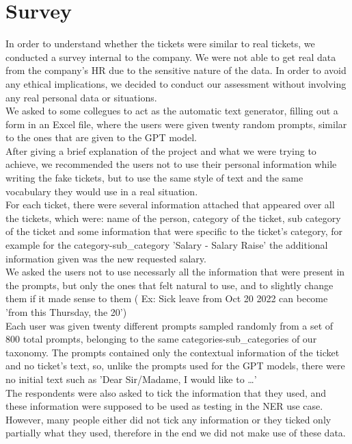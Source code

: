 \section{Survey}
\label{sec:survey}
In order to understand whether the tickets were similar to real tickets, we conducted a survey internal to the company. We were not able to get real data from the company's HR due to the sensitive nature of the data. In order to avoid any ethical implications, we decided to conduct our assessment without involving any real personal data or situations.  \\
We asked to some collegues to act as the automatic text generator, filling out a form in an Excel file, where the users were given twenty random prompts, similar to the ones that are given to the GPT model. \\
After giving a brief explanation of the project and what we were trying to achieve, we recommended the users not to use their personal information while writing the fake tickets, but to use the same style of text and the same vocabulary they would use in a real situation. \\
For each ticket, there were several information attached that appeared over all the tickets, which were: name of the person, category of the ticket, sub category of the ticket and some information that were specific to the ticket's category, for example for the category-sub\_category 'Salary - Salary Raise' the additional information given was the new requested salary. \\
We asked the users not to use necessarly all the information that were present in the prompts, but only the ones that felt natural to use, and to slightly change them if it made sense to them ( Ex: Sick leave from Oct 20 2022 can become 'from this Thursday, the 20') \\
Each user was given twenty different prompts sampled randomly from a set of 800 total prompts, belonging to the same categories-sub\_categories of our taxonomy. The prompts contained only the contextual information of the ticket and no ticket's text, so, unlike the prompts used for the GPT models, there were no initial text such as 'Dear Sir/Madame, I would like to \dots' \\
The respondents were also asked to tick the information that they used, and these information were supposed to be used as testing in the NER use case. However, many people either did not tick any information or they ticked only partially what they used, therefore in the end we did not make use of these data. \\\\

